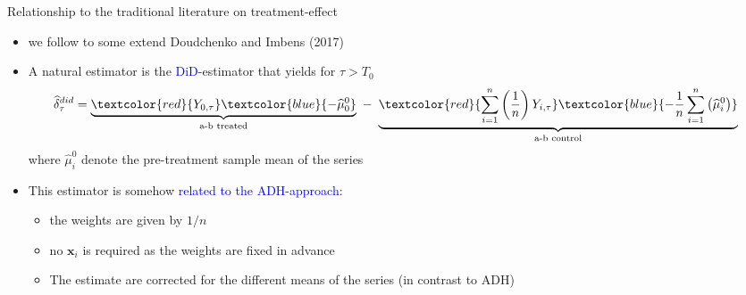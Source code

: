 \documentclass{beamer}
\newcommand{\blue}[1]{\textcolor{blue}{#1}}
\newcommand{\red}[1]{\textcolor{red}{#1}}
\begin{document}
\begin{frame}{Relationship to the traditional literature on treatment-effect}

\begin{itemize}
\item we follow to some extend Doudchenko and Imbens (2017)
\item A natural estimator is the \blue{DiD}-estimator that yields for $\tau>T_0$
\begin{align*}
\widehat \delta_\tau^{did} &= \underbrace{ \red{Y_{0,\tau}} \blue{- \widehat \mu_0^0}}_{\text{a-b treated}} \ - \ \underbrace{ \red{ \sum_{i=1}^n \left( \frac{1}{n} \right) Y_{i,\tau} } \blue{ - \frac{1}{n} \sum_{i=1}^n \left( \widehat \mu_i^0\right)} }_{\text{a-b control}}
\end{align*}
where $\widehat \mu_i^0$ denote the pre-treatment sample mean of the series \smallskip

\item This estimator is somehow \blue{related to the ADH-approach}: \smallskip

\begin{itemize}
\item the weights are given by $1/n$
\item no $\bm{x}_i$ is required as the weights are fixed in advance
\item The estimate are corrected for the different means of the series (in contrast to ADH)
\end{itemize}
\end{itemize}
\end{frame}
\end{document}
